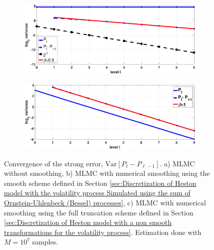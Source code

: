 \begin{figure}[htb]
	\centering %
	\begin{subfigure}{0.5\textwidth}
		\includegraphics[width=\linewidth]{./figures/MLMC_binary_GBM_opt/without_smoothing/digital_option_set1_L_0_2_steps_L_9_N_10_7_strong}
		\caption{}
		\label{fig:strong_rate_GBM_digital_non_smoothing}
	\end{subfigure}\hfil %
	\begin{subfigure}{0.5\textwidth}
		\includegraphics[width=\linewidth]{./figures/MLMC_binary_GBM_opt/with_smoothing/digital_option_set1_L_0_2_steps_L_9_N_10_5_strong}
		\caption{}
		\label{fig:strong_rate_GBM_digital_smoothing}
	\end{subfigure}\hfil 
	\caption{Convergence of  the strong error, $\text{Var}\left[P_{\ell}-P_{\ell-1}\right]$. a) MLMC without smoothing, b) MLMC with numerical smoothing using the smooth scheme defined in Section \ref{sec:Discretization of Heston model with the volatility process Simulated using the sum of  Ornstein-Uhlenbeck (Bessel) processes}, c) MLMC with numerical smoothing using the full truncation scheme defined in Section \ref{sec:Discretization of Heston model with a non smooth transformations for the volatility process}.  Estimation done with $M=10^7$ samples.}
	\label{fig:strong_rate_GBM_digital}	
\end{figure}
\FloatBarrier

